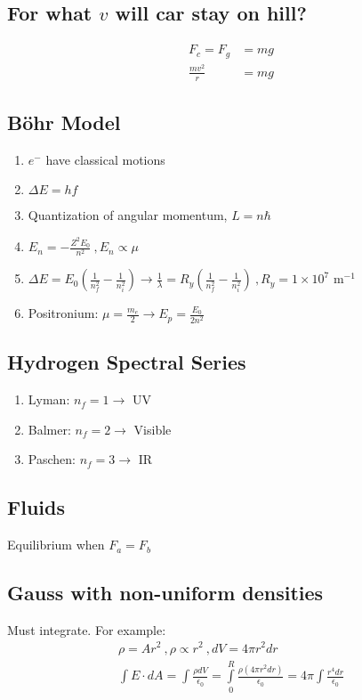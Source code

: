 \documentclass[10pt,letter]{article}
\begin{document}
\subsection{For what $v$ will car stay on hill?}
\begin{align}
 F_c = F_g &= mg\\
 \frac{mv^2}{r} &= mg 
\end{align}

\subsection{B\"ohr Model}
\begin{enumerate}
    \item $e^-$ have classical motions
    \item $\Delta E = hf$
    \item Quantization of angular momentum, $L=n\hbar$
    \item $E_n = -\frac{Z^2E_0}{n^2}~,E_n \propto \mu$
    \item $\Delta E = E_0 \left( \frac{1}{n_f^2} - \frac{1}{n_i^2} \right) \rightarrow \frac{1}{\lambda} = R_y \left( \frac{1}{n_f^2} - \frac{1}{n_i^2}\right)~, R_y = 1\times 10^7$ m$^{-1}$
    \item Positronium: $\mu= \frac{m_e}{2} \rightarrow E_p = \frac{E_0}{2n^2}$
\end{enumerate}

\subsection{Hydrogen Spectral Series}
\begin{enumerate}
    \item Lyman: $n_f = 1 \rightarrow$ UV
    \item Balmer: $n_f = 2 \rightarrow$ Visible
    \item Paschen: $n_f = 3 \rightarrow$ IR
\end{enumerate}

\subsection{Fluids}
Equilibrium when $F_a = F_b$

\subsection{Gauss with non-uniform densities}
Must integrate. For example:
\begin{align}
 \rho = Ar^2~,\rho \propto r^2 ~, dV = 4\pi r^2 dr\\
 \int E \cdot dA = \int \frac{\rho dV}{\epsilon_0} = \int \limits_0^R \frac{\rho(4\pi r^2dr)}{\epsilon_0} = 4\pi \int \frac{r^4 dr}{\epsilon_0}
\end{align}
\end{document}
